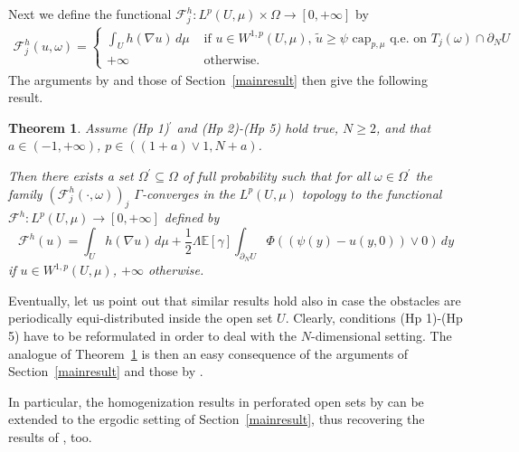 \documentclass[10pt,reqno]{amsart}
\numberwithin{equation}{section}
\def\FF{{\mathcal F}}
\def\Wsp{W^{1,p}}
\def\capmu{\mathrm{cap}_{p,\mu}}
\def\Om{\Omega}
\def\om{\omega}
\def\Teoe{T_{j}(\om)}
\def\tildeu{\tilde{u}}
\def\xnc{y}%
\def\UU{\partial_NU}
\newtheorem{theorem}{Theorem}[section]
\begin{document}
Next we define the functional $\FF_j^h:L^p(U,\mu)\times\Om\to[0,+\infty]$ by
\begin{eqnarray}
  \label{eq:fapprox2}
  \FF_j^h(u,\om)=
  \begin{cases}
\displaystyle{\int_Uh(\nabla u)\,d\mu} &
\text{ if } u\in \Wsp(U,\mu),\,
\tildeu\geq\psi\,\,  \capmu \text{ q.e. on } \Teoe\cap\UU\\
+\infty & \text{ otherwise. }
  \end{cases}
\end{eqnarray}
The arguments by \cite{ANB} and those of Section~\ref{mainresult} then
give the following result.
\begin{theorem}\label{main2}
Assume (Hp 1)$^\prime$ and (Hp 2)-(Hp 5) hold true, $N\geq 2$, and that
$a\in(-1,+\infty)$, $p\in((1+a)\vee 1,N+a)$.

Then there exists a set $\Om^\prime\subseteq\Om$ of full probability
such that for all $\om\in\Om^\prime$ the family
$(\FF_j^h(\cdot,\om))_j$ $\Gamma$-converges in the $L^p(U,\mu)$
topology to the functional $\FF^h:L^p(U,\mu)\to[0,+\infty]$ defined by
\begin{equation}\label{eq:Glimit2}
\FF^h(u)=\int_Uh(\nabla u)\,d\mu+\frac 12
\Lambda\mathbb{E}[\gamma]
\int_{\UU}\Phi((\psi(\xnc)-u(\xnc,0))\vee 0)\,d\xnc
\end{equation}
if $u\in \Wsp(U,\mu)$, $+\infty$ otherwise.
\end{theorem}

Eventually, let us point out that similar results hold also
in case the obstacles are periodically equi-distributed inside
the open set $U$.
Clearly, conditions (Hp 1)-(Hp 5) have to be reformulated in
order to deal with the $N$-dimensional setting.
The analogue of Theorem~\ref{main2} is then an easy consequence of the
arguments of Section~\ref{mainresult} and those by \cite{ANB}.

In particular, the homogenization results in perforated open 
sets by \cite{ANB} can be extended to the ergodic setting of
Section~\ref{mainresult}, thus recovering the results of 
\cite{Caf-Mel1}, too.


\appendix


\section{ }\label{Muck} %
\end{document}
